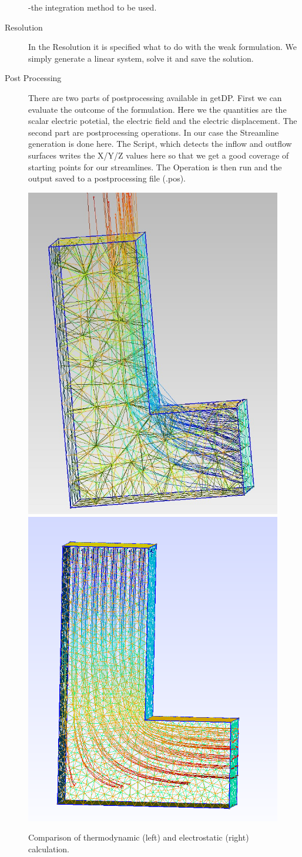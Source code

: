 \documentclass[preprint,journal]{vgtc}       %
\begin{document}
\begin{description}
	-the integration method to be used.\newline
	\item[Resolution]
	In the Resolution it is specified what to do with the weak formulation. We simply generate a linear system, solve it and save the solution.
	\item[Post Processing]
	There are two parts of postprocessing available in getDP. First we can evaluate the outcome of the formulation. Here we the quantities are the scalar electric potetial, the electric field and the electric displacement.
	The second part are postprocessing operations. In our case the Streamline generation is done here. The Script, which detects the inflow and outflow surfaces writes the X/Y/Z values here so that we get a good coverage of starting points for our streamlines. The Operation is then run and the output saved to a postprocessing file (.pos).
	\end{description}
\begin{figure}
	
	\begin{minipage}{\linewidth}
		\includegraphics[width=.5\linewidth]{L.jpg}
		\includegraphics[width=.53\linewidth]{L-ele.png}
		\caption{Comparison of thermodynamic (left) and electrostatic (right) calculation.}
		\label{fig:L}
	\end{minipage}
\end{figure}
\end{document}
